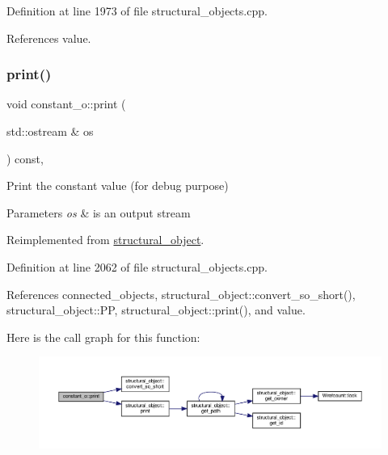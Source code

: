 Definition at line 1973 of file structural\+\_\+objects.\+cpp.



References value.

\mbox{\label{classconstant__o_a9f4a121a1fcf146a4646f383fceb5d0a}} 
\subsubsection{\texorpdfstring{print()}{print()}}
{\footnotesize\ttfamily void constant\+\_\+o\+::print (\begin{DoxyParamCaption}\item[{std\+::ostream \&}]{os }\end{DoxyParamCaption}) const\hspace{0.3cm}{\ttfamily [override]}, {\ttfamily [virtual]}}



Print the constant value (for debug purpose) 


\begin{DoxyParams}{Parameters}
{\em os} & is an output stream \\
\hline
\end{DoxyParams}


Reimplemented from \hyperlink{classstructural__object_a6770e169cf00f814a35b2939ec8f92eb}{structural\+\_\+object}.



Definition at line 2062 of file structural\+\_\+objects.\+cpp.



References connected\+\_\+objects, structural\+\_\+object\+::convert\+\_\+so\+\_\+short(), structural\+\_\+object\+::\+PP, structural\+\_\+object\+::print(), and value.

Here is the call graph for this function\+:
\nopagebreak
\begin{figure}[H]
\begin{center}
\leavevmode
\includegraphics[width=350pt]{d4/d65/classconstant__o_a9f4a121a1fcf146a4646f383fceb5d0a_cgraph}
\end{center}
\end{figure}
\mbox{\label{classconstant__o_ad2453aac32e841ff75d32fb50249ebdc}} 
